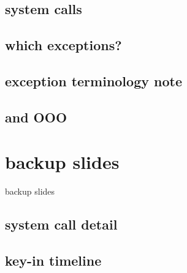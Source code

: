 \subsection{system calls}








\subsection{which exceptions?}


\subsection{exception terminology note}



\subsection{and OOO}


\section{backup slides}
\begin{frame}{backup slides}
\end{frame}

\subsection{system call detail}





\subsection{key-in timeline}



